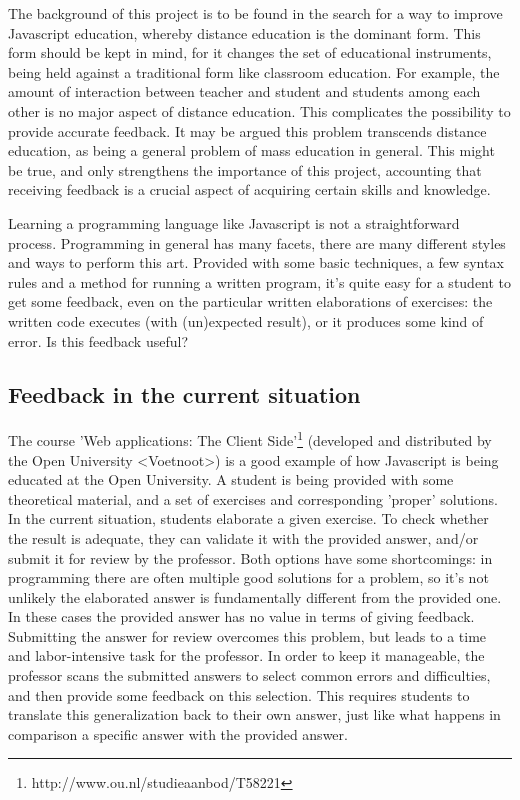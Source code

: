 \documentclass{article}
\begin{document}
The background of this project is to be found in the search for a way to improve Javascript education, whereby distance education is the dominant form. This form should be kept in mind, for it changes the set of educational instruments, being held against a traditional form like classroom education. For example, the amount of interaction between teacher and student and students among each other is no major aspect of distance education. This complicates the possibility to provide accurate feedback. It may be argued this problem transcends distance education, as being a general problem of mass education in general. This might be true, and only strengthens the importance of this project, accounting that receiving feedback is a crucial aspect of acquiring certain skills and knowledge. 

Learning a programming language like Javascript is not a straightforward process. Programming in general has many facets, there are many different styles and ways to perform this art. Provided with some basic techniques, a few syntax rules and a method for running a written program, it's quite easy for a student to get some feedback, even on the particular written elaborations of exercises: the written code executes (with (un)expected result), or it produces some kind of error. Is this feedback useful? 

\subsection{Feedback in the current situation}

The course 'Web applications: The Client Side'\footnote{http://www.ou.nl/studieaanbod/T58221} (developed and distributed by the Open University <Voetnoot>) is a good example of how Javascript is being educated at the Open University. A student is being provided with some theoretical material, and a set of exercises and corresponding 'proper' solutions. In the current situation, students elaborate a given exercise. To check whether the result is adequate, they can validate it with the provided answer, and/or submit it for review by the professor. Both options have some shortcomings: in programming there are often multiple good solutions for a problem, so it’s not unlikely the elaborated answer is fundamentally different from the provided one. In these cases the provided answer has no value in terms of giving feedback. Submitting the answer for review overcomes this problem, but leads to a time and labor-intensive task for the professor. In order to keep it manageable, the professor scans the submitted answers to select common errors and difficulties, and then provide some feedback on this selection. This requires students to translate this generalization back to their own answer, just like what happens in comparison a specific answer with the provided answer.
\end{document}
